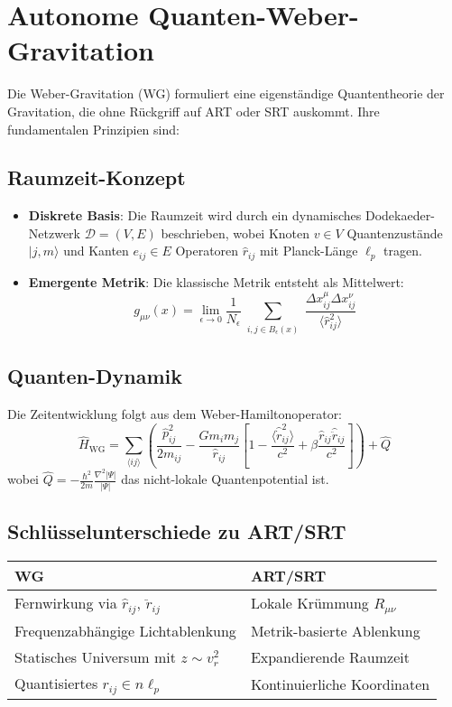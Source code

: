 \section{Autonome Quanten-Weber-Gravitation}
Die Weber-Gravitation (WG) formuliert eine eigenständige Quantentheorie der Gravitation, die ohne Rückgriff auf ART oder SRT auskommt. Ihre fundamentalen Prinzipien sind:

\subsection{Raumzeit-Konzept}
\begin{itemize}
    \item \textbf{Diskrete Basis}: Die Raumzeit wird durch ein dynamisches Dodekaeder-Netzwerk $\mathcal{D}=(V,E)$ beschrieben, wobei Knoten $v\in V$ Quantenzustände $|j,m\rangle$ und Kanten $e_{ij}\in E$ Operatoren $\hat{r}_{ij}$ mit Planck-Länge $\ell_p$ tragen.
    
    \item \textbf{Emergente Metrik}: Die klassische Metrik entsteht als Mittelwert:
    \begin{equation}
        g_{\mu\nu}(x) = \lim_{\epsilon\to0} \frac{1}{N_\epsilon} \sum_{\substack{i,j\in B_\epsilon(x)}} \frac{\Delta x_{ij}^\mu \Delta x_{ij}^\nu}{\langle \hat{r}_{ij}^2 \rangle}
    \end{equation}
\end{itemize}

\subsection{Quanten-Dynamik}
Die Zeitentwicklung folgt aus dem Weber-Hamiltonoperator:
\begin{equation}
    \hat{H}_{\text{WG}} = \sum_{\langle ij \rangle} \left( \frac{\hat{p}_{ij}^2}{2m_{ij}} - \frac{Gm_im_j}{\hat{r}_{ij}} \left[1 - \frac{\langle \hat{\dot{r}}_{ij}^2 \rangle}{c^2} + \beta \frac{\hat{r}_{ij}\hat{\ddot{r}}_{ij}}{c^2}\right] \right) + \hat{Q}
\end{equation}
wobei $\hat{Q} = -\frac{\hbar^2}{2m}\frac{\nabla^2|\Psi|}{|\Psi|}$ das nicht-lokale Quantenpotential ist.

\subsection{Schlüsselunterschiede zu ART/SRT}
\begin{tabular}{ll}
    \textbf{WG} & \textbf{ART/SRT} \\
    \hline
    Fernwirkung via $\hat{r}_{ij}$, $\hat{\ddot{r}}_{ij}$ & Lokale Krümmung $R_{\mu\nu}$ \\
    Frequenzabhängige Lichtablenkung & Metrik-basierte Ablenkung \\
    Statisches Universum mit $z\sim v_r^2$ & Expandierende Raumzeit \\
    Quantisiertes $r_{ij}\in n\ell_p$ & Kontinuierliche Koordinaten \\
\end{tabular}

